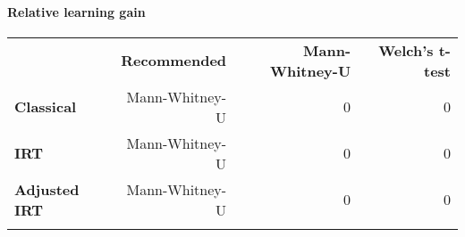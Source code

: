 \paragraph{Relative learning gain}\label{relative-learning-gain}

\begin{longtable}[c]{@{}lrrr@{}}
\toprule\addlinespace
& \textbf{Recommended} & \textbf{Mann-Whitney-U} & \textbf{Welch's
t-test}
\\\addlinespace
\midrule\endhead
\textbf{Classical} & Mann-Whitney-U & 0 & 0
\\\addlinespace
\textbf{IRT} & Mann-Whitney-U & 0 & 0
\\\addlinespace
\textbf{Adjusted IRT} & Mann-Whitney-U & 0 & 0
\\\addlinespace
\bottomrule
\end{longtable}
